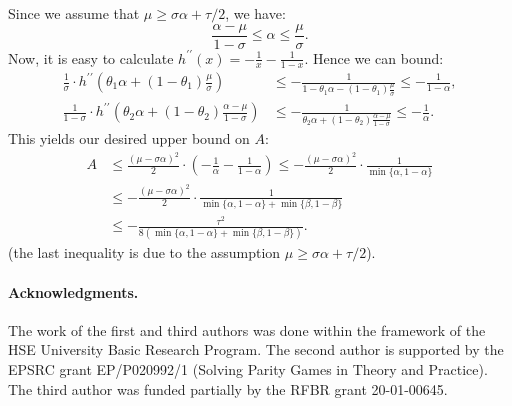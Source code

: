 \documentclass[12pt]{article}
\let\leq\leqslant
\let\geq\geqslant
\let\le\leq
\let\ge\geq
\begin{document}
Since we assume that  $\mu \ge \sigma\alpha + \tau/2$, we have:
$$\frac{\alpha - \mu}{1 - \sigma}\le \alpha \le \frac{\mu}{\sigma}.$$
 Now, it is easy to calculate $h^{\prime\prime}(x) = -\frac{1}{x} - \frac{1}{1 - x}$. Hence we can bound:
\begin{align*}
\frac{1}{\sigma} \cdot h^{\prime\prime}\left(\theta_1\alpha + (1 - \theta_1)\frac{\mu}{\sigma}\right) &\le -\frac{1}{1 - \theta_1\alpha - (1 - \theta_1)\frac{\mu}{\sigma}} \le -\frac{1}{1 -\alpha}, \\
\frac{1}{1 - \sigma} \cdot h^{\prime\prime}\left(\theta_2\alpha + (1 - \theta_2)\frac{\alpha - \mu}{1 - \sigma}\right) &\le -\frac{1}{\theta_2\alpha + (1 - \theta_2)\frac{\alpha - \mu}{1 - \sigma}} \le -\frac{1}{\alpha}.
\end{align*}
This yields our desired upper bound on $A$:
\begin{align*}
A&\le \frac{(\mu - \sigma\alpha)^2}{2} \cdot \left(-\frac{1}{\alpha} - \frac{1}{1 - \alpha}\right) \le -\frac{(\mu - \sigma\alpha)^2}{2} \cdot \frac{1}{\min\{\alpha, 1- \alpha\}} \\
&\le -\frac{(\mu - \sigma\alpha)^2}{2}\cdot \frac{1}{\min\{\alpha, 1- \alpha\} + \min\{\beta, 1 - \beta\}} \\
&\le -\frac{\tau^2}{8(\min\{\alpha, 1- \alpha\} + \min\{\beta, 1 - \beta\})}.
\end{align*}
(the last inequality is due to the assumption $\mu\ge \sigma\alpha + \tau/2$).

\paragraph{Acknowledgments.}
The work of the  first and third authors was done 
 within the framework of the HSE University Basic Research Program. The second author is supported by the EPSRC grant EP/P020992/1 (Solving Parity Games in Theory and Practice).
The third author was funded partially by the RFBR grant 20-01-00645.



\end{document}
